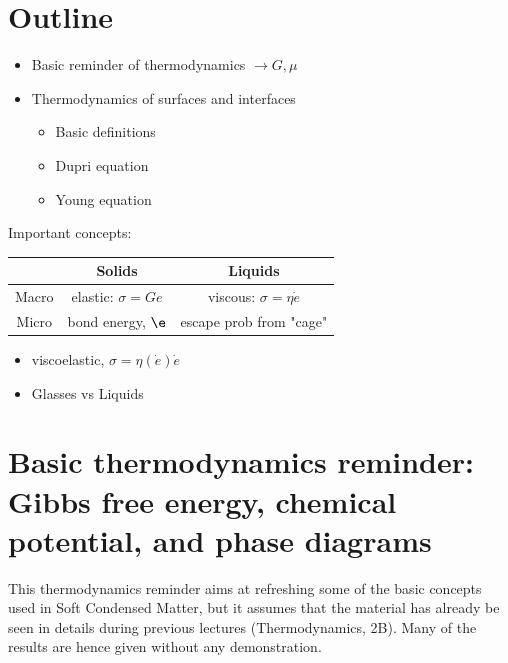 \documentclass[a4paper, 11pt, normalem]{report}
\begin{document}
\section{Outline}
\begin{itemize}
    \item Basic reminder of thermodynamics $\to G,\mu$
    \item Thermodynamics of surfaces and interfaces
        \begin{itemize}
            \item Basic definitions
            \item Dupri equation
            \item Young equation
        \end{itemize}
\end{itemize}
Important concepts:
\begin{table}[H]
    \centering
    \begin{tabular}{c|c|c}
        & Solids & Liquids \\
        \hline
        Macro & elastic: $\sigma = Ge$ & viscous: $\sigma = \eta\dot{e}$ \\
        Micro & bond energy, $\e$ & escape prob from "cage"
    \end{tabular}
\end{table}
\begin{itemize}
    \item viscoelastic, $\sigma = \eta(\dot{e})\dot{e}$
    \item Glasses vs Liquids
\end{itemize}

\section{Basic thermodynamics reminder: Gibbs free energy, chemical potential, and phase diagrams}
This thermodynamics reminder aims at refreshing some of the basic concepts used in Soft Condensed Matter, but it assumes that the material has already be seen in details during previous lectures (Thermodynamics, 2B).
Many of the results are hence given without any demonstration.
\end{document}
